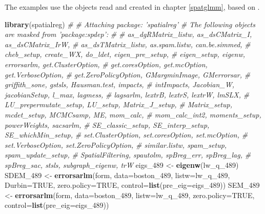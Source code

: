 \documentclass[]{book}
\newenvironment{Shaded}{\begin{snugshade}}{\end{snugshade}}
\newcommand{\CommentTok}[1]{\textcolor[rgb]{0.56,0.35,0.01}{\textit{#1}}}
\newcommand{\DataTypeTok}[1]{\textcolor[rgb]{0.13,0.29,0.53}{#1}}
\newcommand{\DecValTok}[1]{\textcolor[rgb]{0.00,0.00,0.81}{#1}}
\newcommand{\KeywordTok}[1]{\textcolor[rgb]{0.13,0.29,0.53}{\textbf{#1}}}
\newcommand{\NormalTok}[1]{#1}
\newcommand{\OtherTok}[1]{\textcolor[rgb]{0.56,0.35,0.01}{#1}}
\newcommand{\StringTok}[1]{\textcolor[rgb]{0.31,0.60,0.02}{#1}}
\begin{document}
The examples use the objects read and created in chapter \ref{spatglmm}, based on \citet{bivand17}.

\begin{Shaded}
\begin{Highlighting}[]
\KeywordTok{library}\NormalTok{(spatialreg)}
\CommentTok{# }
\CommentTok{# Attaching package: 'spatialreg'}
\CommentTok{# The following objects are masked from 'package:spdep':}
\CommentTok{# }
\CommentTok{#     as_dgRMatrix_listw, as_dsCMatrix_I, as_dsCMatrix_IrW,}
\CommentTok{#     as_dsTMatrix_listw, as.spam.listw, can.be.simmed,}
\CommentTok{#     cheb_setup, create_WX, do_ldet, eigen_pre_setup,}
\CommentTok{#     eigen_setup, eigenw, errorsarlm, get.ClusterOption,}
\CommentTok{#     get.coresOption, get.mcOption, get.VerboseOption,}
\CommentTok{#     get.ZeroPolicyOption, GMargminImage, GMerrorsar,}
\CommentTok{#     griffith_sone, gstsls, Hausman.test, impacts,}
\CommentTok{#     intImpacts, Jacobian_W, jacobianSetup, l_max, lagmess,}
\CommentTok{#     lagsarlm, lextrB, lextrS, lextrW, lmSLX,}
\CommentTok{#     LU_prepermutate_setup, LU_setup, Matrix_J_setup,}
\CommentTok{#     Matrix_setup, mcdet_setup, MCMCsamp, ME, mom_calc,}
\CommentTok{#     mom_calc_int2, moments_setup, powerWeights, sacsarlm,}
\CommentTok{#     SE_classic_setup, SE_interp_setup, SE_whichMin_setup,}
\CommentTok{#     set.ClusterOption, set.coresOption, set.mcOption,}
\CommentTok{#     set.VerboseOption, set.ZeroPolicyOption,}
\CommentTok{#     similar.listw, spam_setup, spam_update_setup,}
\CommentTok{#     SpatialFiltering, spautolm, spBreg_err, spBreg_lag,}
\CommentTok{#     spBreg_sac, stsls, subgraph_eigenw, trW}
\NormalTok{eigs_}\DecValTok{489}\NormalTok{ <-}\StringTok{ }\KeywordTok{eigenw}\NormalTok{(lw_q_}\DecValTok{489}\NormalTok{)}
\NormalTok{SDEM_}\DecValTok{489}\NormalTok{ <-}\StringTok{ }\KeywordTok{errorsarlm}\NormalTok{(form, }\DataTypeTok{data=}\NormalTok{boston_}\DecValTok{489}\NormalTok{, }\DataTypeTok{listw=}\NormalTok{lw_q_}\DecValTok{489}\NormalTok{, }\DataTypeTok{Durbin=}\OtherTok{TRUE}\NormalTok{, }
                       \DataTypeTok{zero.policy=}\OtherTok{TRUE}\NormalTok{, }\DataTypeTok{control=}\KeywordTok{list}\NormalTok{(}\DataTypeTok{pre_eig=}\NormalTok{eigs_}\DecValTok{489}\NormalTok{))}
\NormalTok{SEM_}\DecValTok{489}\NormalTok{ <-}\StringTok{ }\KeywordTok{errorsarlm}\NormalTok{(form, }\DataTypeTok{data=}\NormalTok{boston_}\DecValTok{489}\NormalTok{, }\DataTypeTok{listw=}\NormalTok{lw_q_}\DecValTok{489}\NormalTok{, }
                      \DataTypeTok{zero.policy=}\OtherTok{TRUE}\NormalTok{, }\DataTypeTok{control=}\KeywordTok{list}\NormalTok{(}\DataTypeTok{pre_eig=}\NormalTok{eigs_}\DecValTok{489}\NormalTok{))}
\end{Highlighting}
\end{Shaded}
\end{document}

